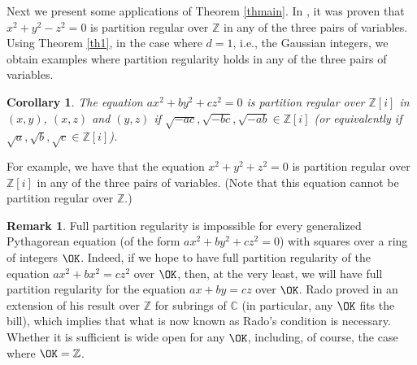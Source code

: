 \documentclass[11pt]{amsart}
\newtheorem{corollary}[lemma]{Corollary}
\theoremstyle{definition}
\newtheorem*{remark}{Remark}
\newcommand{\C}{{\mathbb C}}
\newcommand{\N}{{\mathbb N}}
\newcommand{\Z}{{\mathbb Z}}
\begin{document}
Next we present some applications of Theorem \ref{thmain}.
In \cite{FKM2,FKM1}, it was proven that $x^{2}+y^{2}-z^{2}=0$ is partition regular over $\Z$ in any of the three pairs of variables. 
Using Theorem \ref{th1}, in the case where $d=1$, i.e., the Gaussian integers, we obtain examples where partition regularity holds in any of the three pairs of variables.

\begin{corollary}\label{cor: gaussian integers nice}
    The equation $ax^{2}+by^{2}+cz^{2}=0$ is partition regular over $\Z[i]$ in $(x,y)$, $(x,z)$ and $(y,z)$ if $\sqrt{-ac}, \sqrt{-bc},\sqrt{-ab}\in \Z[i]$ (or equivalently if $\sqrt{a}, \sqrt{b},\sqrt{c}\in \Z[i]$).
\end{corollary}
 
For example, we have that the equation $x^{2}+y^{2}+z^{2}=0$ is partition regular over $\Z[i]$ in any of the three pairs of variables. (Note that this equation cannot be partition regular over $\Z$.)

\begin{remark}
Full partition regularity is impossible for every generalized Pythagorean equation (of the form  $ax^2+by^2+cz^2=0$) with squares over a ring of integers $\OK$. Indeed, if we hope to have full partition regularity of the equation $ax^2+bx^2=cz^2$ over $\OK$, then, at the very least, we will have full partition regularity for the equation $ax+by=cz$ over $\OK$. Rado proved in \cite{rado43} an extension of his result over $\Z$ for subrings of $\C$ (in particular, any $\OK$ fits the bill), which implies that what is now known as Rado's condition is necessary. Whether it is sufficient is wide open for any $\OK$, including, of course, the case where $\OK=\Z$.
\end{remark}
\end{document}
